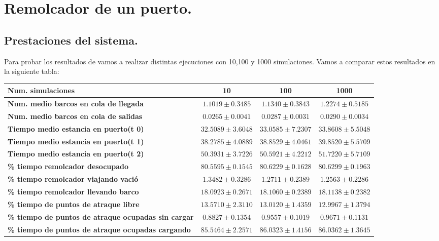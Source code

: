 \documentclass[]{article}
\begin{document}
\section{Remolcador de un puerto.}
\subsection{Prestaciones del sistema.}
Para probar los resultados de vamos a realizar distintas ejecuciones con 10,100 y 1000 simulaciones. Vamos a comparar estos resultados en la siguiente tabla:

\begin{table}[H]
	\begin{center}
		\begin{tabularx}{1\textwidth}{|X|c|c|c|}
			\hline
			\textbf{Num. simulaciones}&\textbf{10} &  \textbf{100} & \textbf{1000} \\
			\hline \hline
			\textbf{Num. medio barcos en cola de llegada}& $1.1019\pm0.3485$ & $1.1340\pm0.3843$ & $1.2274\pm0.5185$ \\ \hline
			\textbf{Num. medio barcos en cola de salidas}& $0.0265\pm0.0041$ & $0.0287\pm0.0031$ & $0.0290\pm0.0034$ \\ \hline
			\textbf{Tiempo medio estancia en puerto(t 0)}& $32.5089\pm3.6048$ & $33.0585\pm7.2307$ & $33.8608\pm5.5048$ \\ \hline
			\textbf{Tiempo medio estancia en puerto(t 1)}& $38.2785\pm4.0889$ & $38.8529\pm4.0461$ & $39.8520\pm5.5709$ \\ \hline
			\textbf{Tiempo medio estancia en puerto(t 2)}& $50.3931\pm3.7226$ & $50.5921\pm4.2212$ & $51.7220\pm5.7109$ \\ \hline
			\textbf{\% tiempo remolcador desocupado}& $80.5595\pm0.1545$ & $80.6229\pm0.1628$ & $80.6299\pm0.1963$ \\ \hline
			\textbf{\% tiempo remolcador viajando vació}& $1.3482\pm0.3286$  & $1.2711\pm0.2389$ & $1.2563\pm0.2286$ \\ \hline
			\textbf{\% tiempo remolcador llevando barco}& $18.0923\pm0.2671$  & $18.1060\pm0.2389$ & $18.1138\pm0.2382$ \\ \hline
			\textbf{\% tiempo de puntos de atraque libre}& $13.5710\pm2.3110$  & $13.0120\pm1.4359$ & $12.9967\pm1.3794$ \\ \hline
			\textbf{\% tiempo de puntos de atraque ocupadas sin cargar}& $0.8827\pm0.1354$ & $0.9557\pm0.1019$ & $0.9671\pm0.1131$ \\ \hline
			\textbf{\% tiempo de puntos de atraque ocupadas cargando}& $85.5464\pm2.2571$ & $86.0323\pm1.4156$ & $86.0362\pm1.3645$ \\ \hline
		\end{tabularx}
		
	\end{center}
\end{table}
\end{document}
